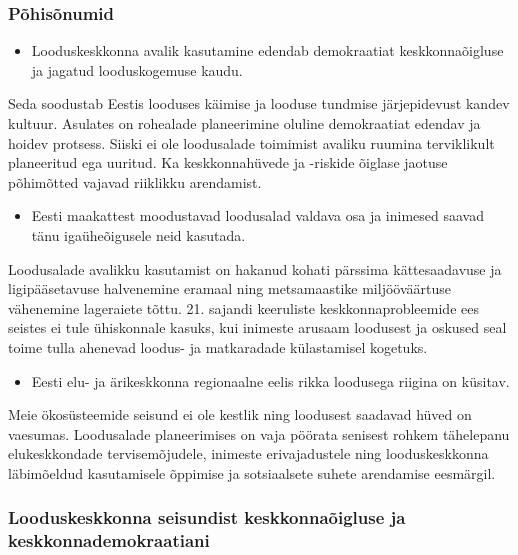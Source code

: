 \documentclass[estonian,]{article}
\providecommand{\tightlist}{%
  \setlength{\itemsep}{0pt}\setlength{\parskip}{0pt}}
\begin{document}
\hypertarget{puxf5hisuxf5numid-2}{%
\subsubsection*{Põhisõnumid}\label{puxf5hisuxf5numid-2}}

\begin{points}
\begin{itemize}
\tightlist
\item
  Looduskeskkonna avalik kasutamine edendab demokraatiat
  keskkonnaõigluse ja jagatud looduskogemuse kaudu.
\end{itemize}

Seda soodustab Eestis looduses käimise ja looduse tundmise järjepidevust
kandev kultuur. Asulates on rohealade planeerimine oluline demokraatiat
edendav ja hoidev protsess. Siiski ei ole loodusalade toimimist avaliku
ruumina terviklikult planeeritud ega uuritud. Ka keskkonnahüvede ja
-riskide õiglase jaotuse põhimõtted vajavad riiklikku arendamist.

\begin{itemize}
\tightlist
\item
  Eesti maakattest moodustavad loodusalad valdava osa ja inimesed saavad
  tänu igaüheõigusele neid kasutada.
\end{itemize}

Loodusalade avalikku kasutamist on hakanud kohati pärssima
kättesaadavuse ja ligipääsetavuse halvenemine eramaal ning metsamaastike
miljööväärtuse vähenemine lageraiete tõttu. 21. sajandi keeruliste
keskkonnaprobleemide ees seistes ei tule ühiskonnale kasuks, kui
inimeste arusaam loodusest ja oskused seal toime tulla ahenevad loodus-
ja matkaradade külastamisel kogetuks.

\begin{itemize}
\tightlist
\item
  Eesti elu- ja ärikeskkonna regionaalne eelis rikka loodusega riigina
  on küsitav.
\end{itemize}

Meie ökosüsteemide seisund ei ole kestlik ning loodusest saadavad hüved
on vaesumas. Loodusalade planeerimises on vaja pöörata senisest rohkem
tähelepanu elukeskkondade tervisemõjudele, inimeste erivajadustele ning
looduskeskkonna läbimõeldud kasutamisele õppimise ja sotsiaalsete suhete
arendamise eesmärgil.
\end{points}

\hypertarget{looduskeskkonna-seisundist-keskkonnauxf5igluse-ja-keskkonnademokraatiani}{%
\subsubsection*{Looduskeskkonna seisundist keskkonnaõigluse ja keskkonnademokraatiani}\label{looduskeskkonna-seisundist-keskkonnauxf5igluse-ja-keskkonnademokraatiani}}
\end{document}
